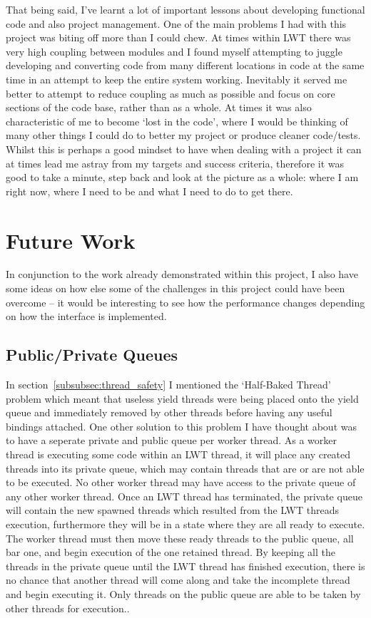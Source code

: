 \documentclass[12pt,twoside,notitlepage]{report}
\begin{document}
That being said, I've learnt a lot of important lessons about developing functional code and also project management. One of the main problems I had with this project was biting off more than I could chew. At times within LWT there
was very high coupling between modules and I found myself attempting to juggle developing and converting code from many different locations in code at the same time in an attempt to keep the entire system working. Inevitably it served
me better to attempt to reduce coupling as much as possible and focus on core sections of the code base, rather than as a whole. At times it was also characteristic of me to become `lost in the code', where I would be thinking of many
other things I could do to better my project or produce cleaner code/tests. Whilst this is perhaps a good mindset to have when dealing with a project it can at times lead me astray from my targets and success criteria, therefore it
was good to take a minute, step back and look at the picture as a whole: where I am right now, where I need to be and what I need to do to get there.

\section{Future Work}
In conjunction to the work already demonstrated within this project, I also have some ideas on how else some of the challenges in this project could have been overcome -- it would be interesting to see how the performance changes
depending on how the interface is implemented.

\subsection{Public/Private Queues}
In section~\ref{subsubsec:thread_safety} I mentioned the `Half-Baked Thread' problem which meant that useless yield threads were being placed onto the yield queue and immediately removed by other threads before having any useful
bindings attached. One other solution to this problem I have thought about was to have a seperate private and public queue per worker thread. As a worker thread is executing some code within an LWT thread, it will place any created
threads into its private queue, which may contain threads that are or are not able to be executed. No other worker thread may have access to the private queue of any other worker thread. Once an LWT thread has terminated, the private
queue will contain the new spawned threads which resulted from the LWT threads execution, furthermore they will be in a state where they are all ready to execute. The worker thread must then move these ready threads to the public
queue, all bar one, and begin execution of the one retained thread. By keeping all the threads in the private queue until the LWT thread has finished execution, there is no chance that another thread will come along and take the
incomplete thread and begin executing it. Only threads on the public queue are able to be taken by other threads for execution..
\end{document}
